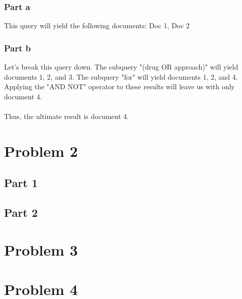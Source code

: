 \documentclass{article}%
\begin{document}
\subsubsection*{Part a}

This query will yield the following documents: Doc 1, Doc 2

\subsubsection*{Part b}

Let's break this query down. The subquery "(drug OR approach)" will yield documents 1, 2, and 3. The subquery "for" will yield documents 1, 2, and 4. Applying the "AND NOT" operator to these results will leave us with only document 4.\\
\\
Thus, the ultimate result is document 4.

\section*{Problem 2}
\subsection*{Part 1}
\subsection*{Part 2}
\section*{Problem 3}
\section*{Problem 4}
\end{document}
